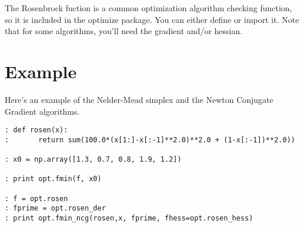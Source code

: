 \documentclass[12pt]{article}
\begin{document}
The Rosenbrock fuction is a common optimization algorithm checking function, so it is included in the optimize package. You can either define or import it.  Note that for some algorithms, you'll need the gradient and/or hessian.


\section*{Example}
Here's an example of the Nelder-Mead simplex and the Newton Conjugate Gradient algorithms.

\begin{lstlisting}
: def rosen(x):
: 		return sum(100.0*(x[1:]-x[:-1]**2.0)**2.0 + (1-x[:-1])**2.0))

: x0 = np.array([1.3, 0.7, 0.8, 1.9, 1.2])

: print opt.fmin(f, x0)

: f = opt.rosen
: fprime = opt.rosen_der
: print opt.fmin_ncg(rosen,x, fprime, fhess=opt.rosen_hess)
\end{lstlisting}
\end{document}
